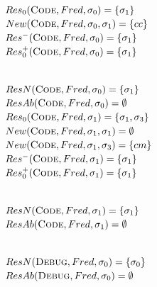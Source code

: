 \documentclass{article}
\begin{document}
\begin{minipage}[t]{0.5\textwidth}
$Res_{0}(\textsc{Code},Fred,\sigma_{0}) = \{\sigma_{1}\}$\\
$New(\textsc{Code},Fred,\sigma_{0},\sigma_{1}) = \{cc\}$\\
$Res^{-}(\textsc{Code},Fred,\sigma_{0}) = \{\sigma_{1}\}$\\
$Res_{0}^{+}(\textsc{Code},Fred,\sigma_{0}) = \{\sigma_{1}\}$\\\

$ResN(\textsc{Code},Fred,\sigma_{0}) = \{\sigma_{1}\}$\\
$ResAb(\textsc{Code},Fred,\sigma_{0}) = \emptyset$\\

$Res_{0}(\textsc{Code},Fred,\sigma_{1}) = \{\sigma_{1},\sigma_{3}\}$\\
$New(\textsc{Code},Fred,\sigma_{1},\sigma_{1}) = \emptyset$\\
$New(\textsc{Code},Fred,\sigma_{1},\sigma_{3}) = \{cm\}$\\
$Res^{-}(\textsc{Code},Fred,\sigma_{1}) = \{\sigma_{1}\}$\\
$Res_{0}^{+}(\textsc{Code},Fred,\sigma_{1}) = \{\sigma_{1}\}$\\\

$ResN(\textsc{Code},Fred,\sigma_{1}) = \{\sigma_{1}\}$\\
$ResAb(\textsc{Code},Fred,\sigma_{1}) = \emptyset$\\\

$ResN(\textsc{Debug},Fred,\sigma_{0}) = \{\sigma_{0}\}$\\
$ResAb(\textsc{Debug},Fred,\sigma_{0}) = \emptyset$\\\
\end{minipage}
\end{document}
